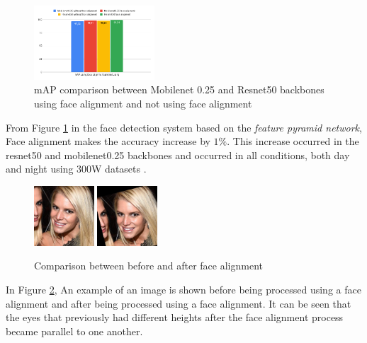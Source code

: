 \begin{figure} [ht]
  \centering
  \includegraphics[width=0.4\textwidth]{gambar/facealigment.png}

  \caption{mAP comparison between Mobilenet 0.25 and Resnet50 backbones using face alignment and not using face alignment}
  \label{fig:facealigment}
\end{figure}

From Figure \ref{fig:facealigment} in the face detection system based on the \emph{feature pyramid network}, Face alignment makes the accuracy increase by $1\%$. This increase occurred in the resnet50 and mobilenet0.25 backbones and occurred in all conditions, both day and night using 300W datasets \citep{sagonas2016300} \citep{sagonas2013300} \citep{sagonas2013semi}.

\begin{figure} [ht]
  \centering
  \includegraphics[width=0.2\textwidth]{gambar/beforefacealigment.jpg}
  \includegraphics[width=0.2\textwidth]{gambar/afterfacealigment.jpg}

  \caption{Comparison between before and after face alignment}
  \label{fig:beforeafterfacealigment}
\end{figure}

In Figure \ref{fig:beforeafterfacealigment}, An example of an image is shown before being processed using a face alignment and after being processed using a face alignment. It can be seen that the eyes that previously had different heights after the face alignment process became parallel to one another.

